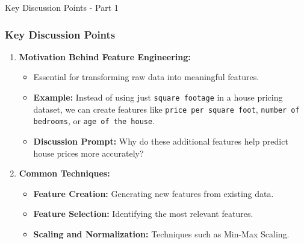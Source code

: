 \documentclass[aspectratio=169]{beamer}
\begin{document}
\begin{frame}[fragile]{Key Discussion Points - Part 1}
    \frametitle{Key Discussion Points}
    \begin{enumerate}
        \item \textbf{Motivation Behind Feature Engineering:}
        \begin{itemize}
            \item Essential for transforming raw data into meaningful features.
            \item \textbf{Example:} Instead of using just \texttt{square footage} in a house pricing dataset, we can create features like \texttt{price per square foot}, \texttt{number of bedrooms}, or \texttt{age of the house}.
            \item \textbf{Discussion Prompt:} Why do these additional features help predict house prices more accurately?
        \end{itemize}
        
        \item \textbf{Common Techniques:}
        \begin{itemize}
            \item \textbf{Feature Creation:} Generating new features from existing data.
            \item \textbf{Feature Selection:} Identifying the most relevant features.
            \item \textbf{Scaling and Normalization:} Techniques such as Min-Max Scaling.
        \end{itemize}
    \end{enumerate}
\end{frame}
\end{document}
